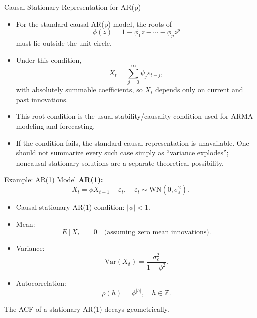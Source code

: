 \documentclass{beamer}
\begin{document}
\begin{frame}{Causal Stationary Representation for AR(p)}
  \begin{itemize}
    \item For the standard causal AR(p) model, the roots of
      \[\phi(z)=1-\phi_1 z-\cdots-\phi_p z^p\]
      must lie outside the unit circle.
    \item Under this condition,
      \[X_t=\sum_{j=0}^{\infty}\psi_j\varepsilon_{t-j},\]
      with absolutely summable coefficients, so $X_t$ depends only on current and past innovations.
    \item This root condition is the usual stability/causality condition used for ARMA modeling and forecasting.
    \item If the condition fails, the standard causal representation is unavailable. One should not summarize every such case simply as “variance explodes”; noncausal stationary solutions are a separate theoretical possibility.
  \end{itemize}
\end{frame}
\begin{frame}{Example: AR(1) Model}
  \textbf{AR(1):}
  \[
    X_t = \phi X_{t-1} + \varepsilon_t, \quad \varepsilon_t \sim \text{WN}(0, \sigma_\varepsilon^2).
  \]

  \vspace{0.3cm}
  \begin{itemize}
    \item Causal stationary AR(1) condition: $|\phi| < 1$.
    \item Mean:
      \[
        E[X_t] = 0 \quad \text{(assuming zero mean innovations)}.
      \]
    \item Variance:
      \[
        \mathrm{Var}(X_t) = \frac{\sigma_\varepsilon^2}{1 - \phi^2}.
      \]
    \item Autocorrelation:
      \[
        \rho(h) = \phi^{|h|}, \quad h \in \mathbb{Z}.
      \]
  \end{itemize}

  \vspace{0.2cm}
  The ACF of a stationary AR(1) decays geometrically.
\end{frame}
\end{document}
